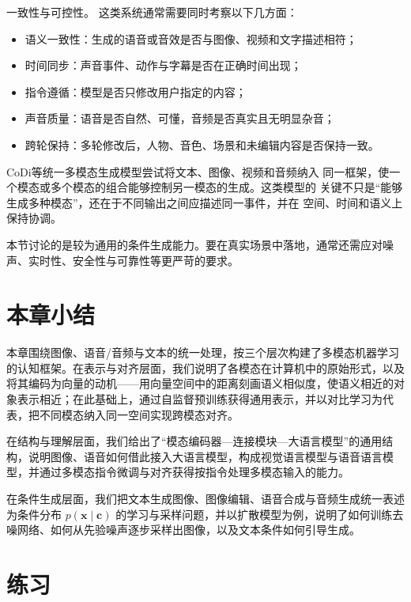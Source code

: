 一致性与可控性。
这类系统通常需要同时考察以下几方面：

\begin{itemize}
  \item 语义一致性：生成的语音或音效是否与图像、视频和文字描述相符；
  \item 时间同步：声音事件、动作与字幕是否在正确时间出现；
  \item 指令遵循：模型是否只修改用户指定的内容；
  \item 声音质量：语音是否自然、可懂，音频是否真实且无明显杂音；
  \item 跨轮保持：多轮修改后，人物、音色、场景和未编辑内容是否保持一致。
\end{itemize}

CoDi\cite{codi}等统一多模态生成模型尝试将文本、图像、视频和音频纳入
同一框架，使一个模态或多个模态的组合能够控制另一模态的生成。这类模型的
关键不只是“能够生成多种模态”，还在于不同输出之间应描述同一事件，并在
空间、时间和语义上保持协调。

\begin{importantnote}
  本节讨论的是较为通用的条件生成能力。要在真实场景中落地，通常还需应对噪声、实时性、安全性与可靠性等更严苛的要求。
\end{importantnote}


\section{本章小结}

本章围绕图像、语音/音频与文本的统一处理，按三个层次构建了多模态机器学习的认知框架。在表示与对齐层面，我们说明了各模态在计算机中的原始形式，以及将其编码为向量的动机——用向量空间中的距离刻画语义相似度，使语义相近的对象表示相近；在此基础上，通过自监督预训练获得通用表示，并以对比学习为代表，把不同模态纳入同一空间实现跨模态对齐。

在结构与理解层面，我们给出了“模态编码器—连接模块—大语言模型”的通用结构，说明图像、语音如何借此接入大语言模型，构成视觉语言模型与语音语言模型，并通过多模态指令微调与对齐获得按指令处理多模态输入的能力。

在条件生成层面，我们把文本生成图像、图像编辑、语音合成与音频生成统一表述为条件分布 $p(\mathbf{x}\mid\mathbf{c})$ 的学习与采样问题，并以扩散模型为例，说明了如何训练去噪网络、如何从先验噪声逐步采样出图像，以及文本条件如何引导生成。

\section*{练习}

